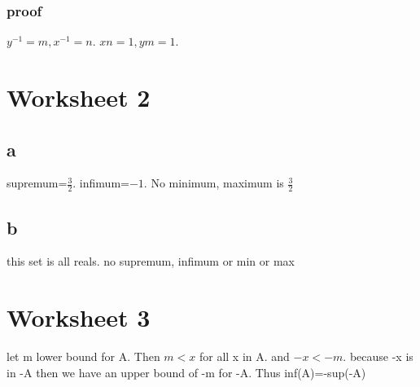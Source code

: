 \documentclass[letterpaper]{article}
\begin{document}
\subsubsection*{proof}
$y^{-1}=m, x^{-1}=n$. $xn=1, ym=1$. 
\section*{Worksheet 2}
\subsection*{a}
supremum=$\frac{3}{2}$. infimum=$-1$. No minimum, maximum is $\frac{3}{2}$
\subsection*{b}
this set is all reals. no supremum, infimum or min or max
\section*{Worksheet 3}
let m lower bound for A. Then $m<x$ for all x in A. and $-x < -m$. because -x is in -A then we have an upper bound of -m for -A. Thus inf(A)=-sup(-A)
\end{document}
